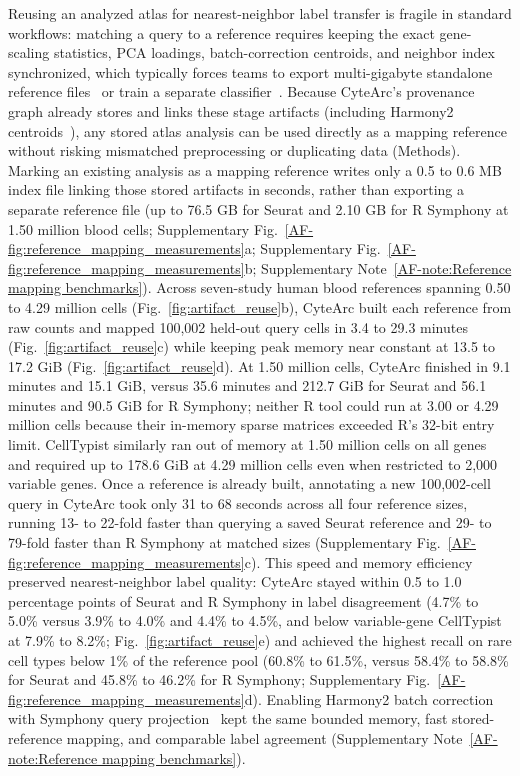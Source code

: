 \documentclass[11pt]{article}
\newcommand{\sref}[1]{\ref*{AF-#1}}
\begin{document}
Reusing an analyzed atlas for nearest-neighbor label transfer is fragile in standard workflows: matching a query to a reference requires keeping the exact gene-scaling statistics, PCA loadings, batch-correction centroids, and neighbor index synchronized, which typically forces teams to export multi-gigabyte standalone reference files~\cite{hao2021} or train a separate classifier~\cite{dominguez2022}. Because CyteArc's provenance graph already stores and links these stage artifacts (including Harmony2 centroids~\cite{korsunsky2019,patikas2026integration}), any stored atlas analysis can be used directly as a mapping reference without risking mismatched preprocessing or duplicating data (Methods). Marking an existing analysis as a mapping reference writes only a 0.5 to 0.6 MB index file linking those stored artifacts in seconds, rather than exporting a separate reference file (up to 76.5 GB for Seurat and 2.10 GB for R Symphony at 1.50 million blood cells; Supplementary Fig.~\sref{fig:reference_mapping_measurements}a; Supplementary Fig.~\sref{fig:reference_mapping_measurements}b; Supplementary Note~\sref{note:Reference mapping benchmarks}). Across seven-study human blood references spanning 0.50 to 4.29 million cells (Fig.~\ref{fig:artifact_reuse}b), CyteArc built each reference from raw counts and mapped 100,002 held-out query cells in 3.4 to 29.3 minutes (Fig.~\ref{fig:artifact_reuse}c) while keeping peak memory near constant at 13.5 to 17.2 GiB (Fig.~\ref{fig:artifact_reuse}d). At 1.50 million cells, CyteArc finished in 9.1 minutes and 15.1 GiB, versus 35.6 minutes and 212.7 GiB for Seurat and 56.1 minutes and 90.5 GiB for R Symphony; neither R tool could run at 3.00 or 4.29 million cells because their in-memory sparse matrices exceeded R's 32-bit entry limit. CellTypist similarly ran out of memory at 1.50 million cells on all genes and required up to 178.6 GiB at 4.29 million cells even when restricted to 2,000 variable genes. Once a reference is already built, annotating a new 100,002-cell query in CyteArc took only 31 to 68 seconds across all four reference sizes, running 13- to 22-fold faster than querying a saved Seurat reference and 29- to 79-fold faster than R Symphony at matched sizes (Supplementary Fig.~\sref{fig:reference_mapping_measurements}c). This speed and memory efficiency preserved nearest-neighbor label quality: CyteArc stayed within 0.5 to 1.0 percentage points of Seurat and R Symphony in label disagreement (4.7\% to 5.0\% versus 3.9\% to 4.0\% and 4.4\% to 4.5\%, and below variable-gene CellTypist at 7.9\% to 8.2\%; Fig.~\ref{fig:artifact_reuse}e) and achieved the highest recall on rare cell types below 1\% of the reference pool (60.8\% to 61.5\%, versus 58.4\% to 58.8\% for Seurat and 45.8\% to 46.2\% for R Symphony; Supplementary Fig.~\sref{fig:reference_mapping_measurements}d). Enabling Harmony2 batch correction with Symphony query projection~\cite{kang2021} kept the same bounded memory, fast stored-reference mapping, and comparable label agreement (Supplementary Note~\sref{note:Reference mapping benchmarks}).
\end{document}
